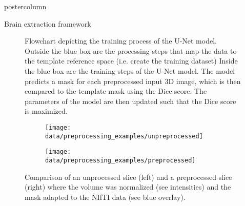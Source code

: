 \begin{frame}
\begin{columns}
\begin{column}{.42\textwidth}
\begin{beamercolorbox}[center]{postercolumn}
\begin{minipage}{.98\textwidth}
{\begin{myblock}{Brain extraction framework}
                                \begin{figure}
                                    \centering
                                    \vspace{0.5em}
                                    \caption{
                                        Flowchart depicting the training process of the U-Net model. Outside the blue box are the processing steps that map the data to the template reference space (i.e. create the training dataset)
                                        Inside the blue box are the training steps of the U-Net model.
                                        The model predicts a mask for each preprocessed input 3D image, which is then compared to the template mask using the Dice score. The parameters of the model are then updated such that the Dice score is maximized.
                                    }
                                    \label{training_graph}
                                \end{figure}

                                \begin{figure}
                                    \centering
                                    \begin{subfigure}{0.25\textwidth}
                                        \centering
                                        \texttt{[image: data/preprocessing\_examples/unpreprocessed]}
                                    \end{subfigure}
                                    \hspace{2em}
                                    \begin{subfigure}{0.25\textwidth}
                                        \centering
                                        \texttt{[image: data/preprocessing\_examples/preprocessed]}
                                    \end{subfigure}
                                    \vspace{-0.5em}
                                    \caption{Comparison of an unprocessed slice (left) and a preprocessed slice (right) where the volume was normalized (see intensities) and the mask adapted to the NIfTI data (see blue overlay).}
                                    \label{preprocessing_xample}
                                \end{figure}
                            \end{myblock}\vfill





}
\end{minipage}
\end{beamercolorbox}
\end{column}
\end{columns}
\end{frame}
